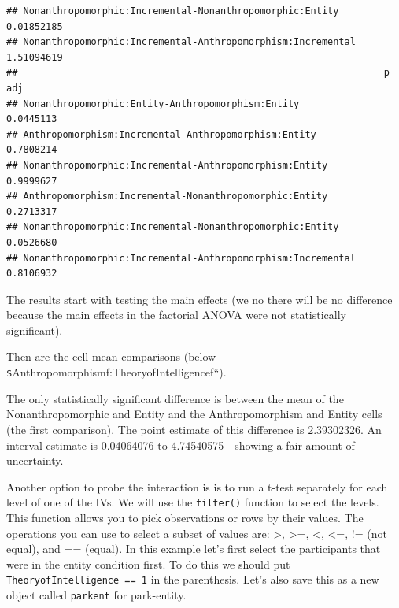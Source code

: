 \documentclass[
]{book}
\newenvironment{Shaded}{\begin{snugshade}}{\end{snugshade}}
\newcommand{\DecValTok}[1]{\textcolor[rgb]{0.00,0.00,0.81}{#1}}
\newcommand{\KeywordTok}[1]{\textcolor[rgb]{0.13,0.29,0.53}{\textbf{#1}}}
\newcommand{\NormalTok}[1]{#1}
\newcommand{\OperatorTok}[1]{\textcolor[rgb]{0.81,0.36,0.00}{\textbf{#1}}}
\newcommand{\StringTok}[1]{\textcolor[rgb]{0.31,0.60,0.02}{#1}}
\begin{document}
\begin{verbatim}
## Nonanthropomorphic:Incremental-Nonanthropomorphic:Entity    0.01852185
## Nonanthropomorphic:Incremental-Anthropomorphism:Incremental 1.51094619
##                                                                 p adj
## Nonanthropomorphic:Entity-Anthropomorphism:Entity           0.0445113
## Anthropomorphism:Incremental-Anthropomorphism:Entity        0.7808214
## Nonanthropomorphic:Incremental-Anthropomorphism:Entity      0.9999627
## Anthropomorphism:Incremental-Nonanthropomorphic:Entity      0.2713317
## Nonanthropomorphic:Incremental-Nonanthropomorphic:Entity    0.0526680
## Nonanthropomorphic:Incremental-Anthropomorphism:Incremental 0.8106932
\end{verbatim}

The results start with testing the main effects (we no there will be no difference because the main effects in the factorial ANOVA were not statistically significant).

Then are the cell mean comparisons (below \texttt{\$}Anthropomorphismf:TheoryofIntelligencef``).

The only statistically significant difference is between the mean of the Nonanthropomorphic and Entity and the Anthropomorphism and Entity cells (the first comparison). The point estimate of this difference is 2.39302326. An interval estimate is 0.04064076 to 4.74540575 - showing a fair amount of uncertainty.

Another option to probe the interaction is is to run a t-test separately for each level of one of the IVs. We will use the \texttt{filter()} function to select the levels. This function allows you to pick observations or rows by their values. The operations you can use to select a subset of values are: \textgreater, \textgreater=, \textless, \textless=, != (not equal), and == (equal). In this example let's first select the participants that were in the entity condition first. To do this we should put \texttt{TheoryofIntelligence\ ==\ 1} in the parenthesis. Let's also save this as a new object called \texttt{parkent} for park-entity.

\begin{Shaded}
\end{Shaded}
\end{document}
